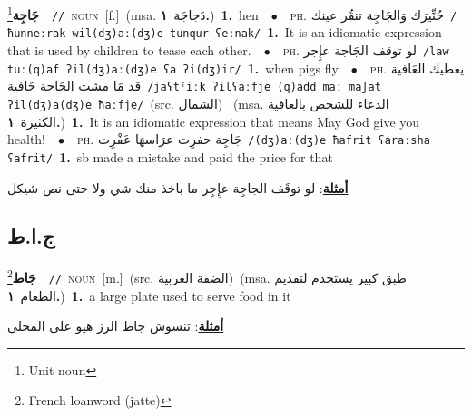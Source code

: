 \documentclass[10pt,a4paper,twoside]{article} %
\begin{document}
\begin{multicols}{2}
{\setlength\topsep{0pt}\textbf{\foreignlanguage{arabic}{جَاجِة}}\footnote{Unit noun}\ \ {\color{gray}\texttt{//}\color{black}}\ \textsc{noun}\ [f.]\ \color{gray}(msa. \foreignlanguage{arabic}{دَجاجَة}~\foreignlanguage{arabic}{\textbf{١.}})\color{black}\ \textbf{1.}~hen\ \ $\bullet$\ \ \textsc{ph.} \color{gray} \foreignlanguage{arabic}{حُنِّيرَك وَالجَاجِة تنقُر عينك}\color{black}\ {\color{gray}\texttt{/{\sffamily ħunneːrak wil(dʒ)aː(dʒ)e tunqur ʕeːnak}/}\color{black}}\ \textbf{1.}~It is an idiomatic expression that is used by children to tease each other.\ \ $\bullet$\ \ \textsc{ph.} \color{gray} \foreignlanguage{arabic}{لو توقف الجَاجة عإِجر}\color{black}\ {\color{gray}\texttt{/{\sffamily law tuː(q)af ʔil(dʒ)aː(dʒ)e ʕa ʔi(dʒ)ir}/}\color{black}}\ \textbf{1.}~when pigs fly\ \ $\bullet$\ \ \textsc{ph.} \color{gray} \foreignlanguage{arabic}{يعطيك العَافية قد مَا مشت الجَاجة حَافية}\color{black}\ {\color{gray}\texttt{/{\sffamily jaʕtˤiːk ʔilʕaːfje (q)add maː maʃat ʔil(dʒ)a(dʒ)e ħaːfje}/}\color{black}}\ \color{gray}(src. \foreignlanguage{arabic}{الشمال})\color{black}\ \color{gray} (msa. \foreignlanguage{arabic}{الدعاء للشخص بالعافية الكثيرة}~\foreignlanguage{arabic}{\textbf{١.}})\color{black}\ \textbf{1.}~It is an idiomatic expression that means May God give you health!\ \ $\bullet$\ \ \textsc{ph.} \color{gray} \foreignlanguage{arabic}{جَاجِة حفرِت عرَاسهَا عَفْرِت}\color{black}\ {\color{gray}\texttt{/{\sffamily (dʒ)aː(dʒ)e ħafrit ʕaraːsha ʕafrit}/}\color{black}}\ \textbf{1.}~sb made a mistake and paid the price for that\  \begin{flushright}\color{gray}\foreignlanguage{arabic}{\textbf{\underline{\foreignlanguage{arabic}{أمثلة}}}: لو توقَف الجاجِة عإِجِر ما باخذ منك شي ولا حتى نص شيكل}\end{flushright}\color{black}} \vspace{2mm}

\vspace{-3mm}
\subsection*{\color{blue}\foreignlanguage{arabic}{ج.ا.ط}\color{blue}{ (ntws)}} 

{\setlength\topsep{0pt}\textbf{\foreignlanguage{arabic}{جَاط}}\footnote{French loanword (jatte)}\ \ {\color{gray}\texttt{//}\color{black}}\ \textsc{noun}\ [m.]\ (src. \color{gray}\foreignlanguage{arabic}{الضفة الغربية}\color{black})\ \color{gray}(msa. \foreignlanguage{arabic}{طبق كبير يستخدم لتقديم الطعام}~\foreignlanguage{arabic}{\textbf{١.}})\color{black}\ \textbf{1.}~a large plate used to serve food in it\  \begin{flushright}\color{gray}\foreignlanguage{arabic}{\textbf{\underline{\foreignlanguage{arabic}{أمثلة}}}: تنسوش جاط الرز هيو على المحلى}\end{flushright}\color{black}} \vspace{2mm}


\end{multicols}
\end{document}

